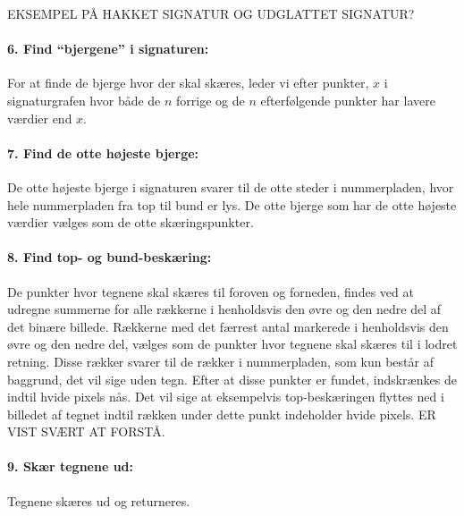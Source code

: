 EKSEMPEL PÅ HAKKET SIGNATUR OG UDGLATTET SIGNATUR?


\paragraph{6. Find ``bjergene'' i signaturen:}
For at finde de bjerge hvor der skal skæres, leder vi efter punkter, $x$ i signaturgrafen hvor både de $n$ forrige og de $n$ efterfølgende punkter har lavere værdier end $x$.

\paragraph{7. Find de otte højeste bjerge:}
De otte højeste bjerge i signaturen svarer til de otte steder i nummerpladen, hvor hele nummerpladen fra top til bund er lys. De otte bjerge som har de otte højeste værdier vælges som de otte skæringspunkter.

\paragraph{8. Find top- og bund-beskæring:} De punkter hvor tegnene skal skæres til foroven og forneden, findes ved at udregne summerne for alle rækkerne i henholdsvis den øvre og den nedre del af det binære billede. Rækkerne med det færrest antal markerede i henholdsvis den øvre og den nedre del, vælges som de punkter hvor tegnene skal skæres til i lodret retning. Disse rækker svarer til de rækker i nummerpladen, som kun består af baggrund, det vil sige uden tegn. Efter at disse punkter er fundet, indskrænkes de indtil hvide pixels nås. Det vil sige at eksempelvis top-beskæringen flyttes ned i billedet af tegnet indtil rækken under dette punkt indeholder hvide pixels. ER VIST SVÆRT AT FORSTÅ.

\paragraph{9. Skær tegnene ud:} Tegnene skæres ud og returneres.



